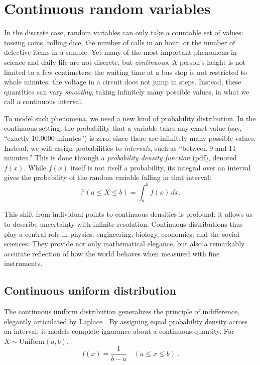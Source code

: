 \documentclass{book}
\begin{document}
\section{Continuous random variables}

In the discrete case, random variables can only take a countable set of values: tossing coins, rolling dice, the number of calls in an hour, or the number of defective items in a sample. Yet many of the most important phenomena in science and daily life are not discrete, but \textit{continuous}. A person’s height is not limited to a few centimeters; the waiting time at a bus stop is not restricted to whole minutes; the voltage in a circuit does not jump in steps. Instead, these quantities can vary \textit{smoothly}, taking infinitely many possible values, in what we call a continuous interval.

\medskip

To model such phenomena, we need a new kind of probability distribution. In the continuous setting, the probability that a variable takes any exact value (say, “exactly 10.0000 minutes”) is zero, since there are infinitely many possible values. Instead, we will assign probabilities to \textit{intervals}, such as “between 9 and 11 minutes.” This is done through a \textit{probability density function} (pdf), denoted $f(x)$. While $f(x)$ itself is not itself a probability, its integral over an interval gives the probability of the random variable falling in that interval:
\begin{equation}
	\mathbb{P}(a \leq X \leq b) = \int_a^b f(x) \, dx.
\end{equation}

This shift from individual points to continuous densities is profound: it allows us to describe uncertainty with infinite resolution. Continuous distributions thus play a central role in physics, engineering, biology, economics, and the social sciences. They provide not only mathematical elegance, but also a remarkably accurate reflection of how the world behaves when measured with fine instruments.

\subsection*{Continuous uniform distribution}

The continuous uniform distribution generalizes the principle of indifference, elegantly articulated by Laplace \cite{laplace-probability}. By assigning equal probability density across an interval, it models complete ignorance about a continuous quantity. For $X \sim \text{Uniform}(a,b)$,
\begin{equation}
	f(x) = \frac{1}{b - a} \quad (a \leq x \leq b) \; .
	\label{eq:continuous_uniform}
\end{equation}
\end{document}
